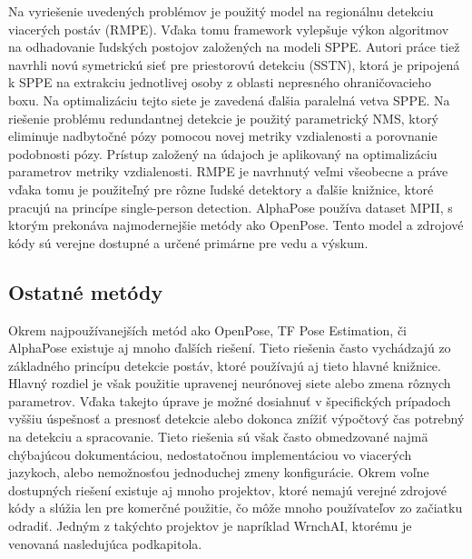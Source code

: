 \documentclass[slovak,master,dept460,male,cpp,cpdeclaration]{diploma}
\begin{document}
Na vyriešenie uvedených problémov je použitý model na regionálnu detekciu viacerých postáv (RMPE). Vďaka tomu
framework vylepšuje výkon algoritmov na odhadovanie ľudských postojov založených na modeli SPPE. Autori práce tiež navrhli novú symetrickú sieť pre priestorovú detekciu (SSTN), ktorá je pripojená k SPPE na extrakciu jednotlivej osoby z
oblasti nepresného ohraničovacieho boxu. Na optimalizáciu tejto siete je zavedená ďalšia paralelná vetva SPPE. Na riešenie problému redundantnej detekcie je použitý parametrický NMS, ktorý eliminuje nadbytočné pózy pomocou novej metriky vzdialenosti a porovnanie podobnosti pózy. Prístup založený na údajoch je
aplikovaný na optimalizáciu parametrov metriky vzdialenosti. RMPE je navrhnutý veľmi všeobecne a práve vďaka tomu je použiteľný pre rôzne ľudské detektory a ďalšie knižnice, ktoré pracujú na princípe single-person detection. AlphaPose používa dataset MPII, s ktorým prekonáva najmodernejšie metódy ako OpenPose. Tento model a zdrojové kódy\cite{githubAlphaPose} sú verejne dostupné a určené primárne pre vedu a výskum.

\newpage
\subsection{Ostatné metódy}
Okrem  najpoužívanejších metód ako OpenPose, TF Pose Estimation, či AlphaPose existuje aj mnoho ďalších riešení. Tieto riešenia často vychádzajú zo základného princípu detekcie postáv, ktoré používajú aj tieto hlavné knižnice. Hlavný rozdiel je však použitie upravenej neurónovej siete alebo zmena rôznych parametrov. Vďaka takejto úprave je možné dosiahnuť v špecifických prípadoch vyššiu úspešnosť a presnosť detekcie alebo dokonca znížiť výpočtový čas potrebný na detekciu a spracovanie. Tieto riešenia sú však často obmedzované najmä chýbajúcou dokumentáciou, nedostatočnou implementáciou vo viacerých jazykoch, alebo nemožnosťou jednoduchej zmeny konfigurácie. Okrem voľne dostupných riešení existuje aj mnoho projektov, ktoré nemajú verejné zdrojové kódy a slúžia len pre komerčné použitie, čo môže mnoho používateľov zo začiatku odradiť. Jedným z takýchto projektov je napríklad WrnchAI, ktorému je venovaná nasledujúca podkapitola.
\end{document}
